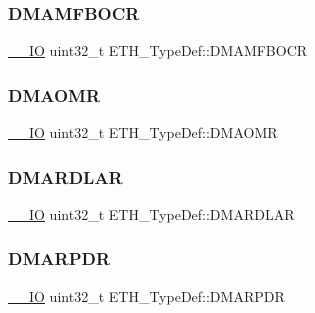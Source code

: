 \mbox{\label{struct_e_t_h___type_def_aa031754e61b60bbbec393be19fb30036}} 
\subsubsection{\texorpdfstring{DMAMFBOCR}{DMAMFBOCR}}
{\footnotesize\ttfamily \mbox{\hyperlink{group___c_m_s_i_s___c_m3__core__definitions_gaec43007d9998a0a0e01faede4133d6be}{\+\_\+\+\_\+\+IO}} uint32\+\_\+t E\+T\+H\+\_\+\+Type\+Def\+::\+D\+M\+A\+M\+F\+B\+O\+CR}

\mbox{\label{struct_e_t_h___type_def_a28b3943a7ad7db88c59a5f690446eacd}} 
\subsubsection{\texorpdfstring{DMAOMR}{DMAOMR}}
{\footnotesize\ttfamily \mbox{\hyperlink{group___c_m_s_i_s___c_m3__core__definitions_gaec43007d9998a0a0e01faede4133d6be}{\+\_\+\+\_\+\+IO}} uint32\+\_\+t E\+T\+H\+\_\+\+Type\+Def\+::\+D\+M\+A\+O\+MR}

\mbox{\label{struct_e_t_h___type_def_a46aafb9acbd753c23f89a9f57b68b64f}} 
\subsubsection{\texorpdfstring{DMARDLAR}{DMARDLAR}}
{\footnotesize\ttfamily \mbox{\hyperlink{group___c_m_s_i_s___c_m3__core__definitions_gaec43007d9998a0a0e01faede4133d6be}{\+\_\+\+\_\+\+IO}} uint32\+\_\+t E\+T\+H\+\_\+\+Type\+Def\+::\+D\+M\+A\+R\+D\+L\+AR}

\mbox{\label{struct_e_t_h___type_def_aedb2e74c294ffed25c952b17e5bc0fc4}} 
\subsubsection{\texorpdfstring{DMARPDR}{DMARPDR}}
{\footnotesize\ttfamily \mbox{\hyperlink{group___c_m_s_i_s___c_m3__core__definitions_gaec43007d9998a0a0e01faede4133d6be}{\+\_\+\+\_\+\+IO}} uint32\+\_\+t E\+T\+H\+\_\+\+Type\+Def\+::\+D\+M\+A\+R\+P\+DR}

